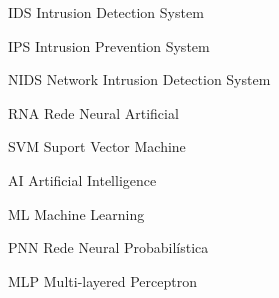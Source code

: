 \documentclass[
	12pt,				%
	openright,			%
	oneside,
	a4paper,			%
	english,			%
	french,				%
	spanish,			%
	brazil				%
	]{abntex2}
\begin{document}
\frenchspacing 


\imprimircapa

\imprimirfolhaderosto%


\setlength{\absparsep}{18pt} %
   



\begin{siglas}
  \item[IDS] Intrusion Detection System
  \item[IPS] Intrusion Prevention System
  \item[NIDS] Network Intrusion Detection System
  \item[RNA] Rede Neural Artificial
  \item[SVM] Suport Vector Machine
  \item[AI] Artificial Intelligence
  \item[ML] Machine Learning
  \item[PNN] Rede Neural Probabilística
  \item[MLP] Multi-layered Perceptron  
\end{siglas}

\tableofcontents*
\cleardoublepage

\textual

\end{document}
